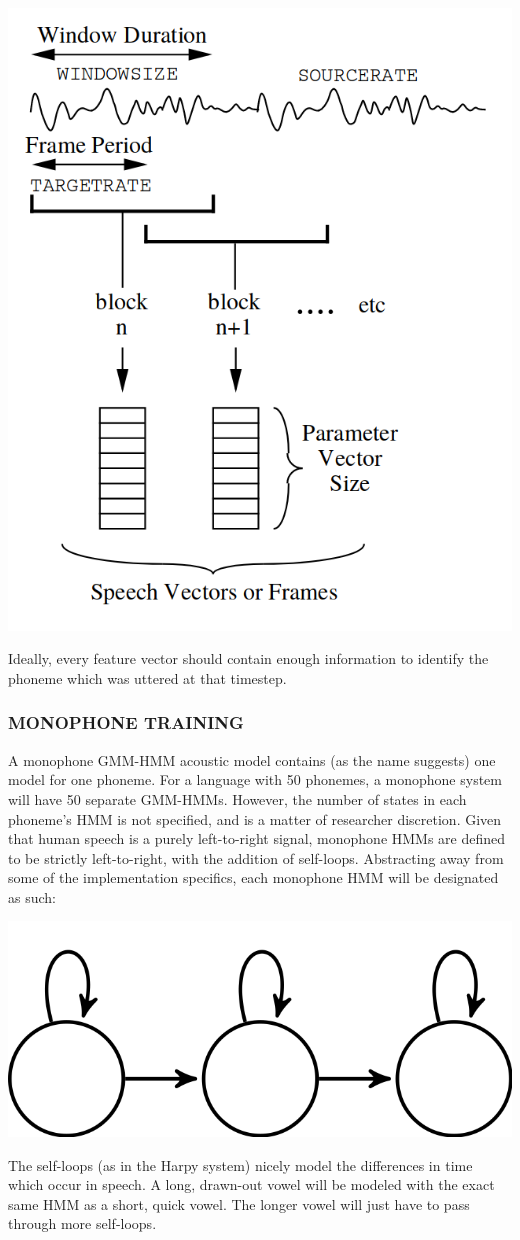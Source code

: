 \documentclass[10pt,a4paper]{article}
\begin{document}
  
\begin{center}
\includegraphics[width=.45\textwidth,keepaspectratio]{figs/htk-feats.png}
\end{center}

Ideally, every feature vector should contain enough information to identify the phoneme which was uttered at that timestep.


\subsubsection*{MONOPHONE TRAINING}

  A monophone GMM-HMM acoustic model contains (as the name suggests) one model for one phoneme. For a language with 50 phonemes, a monophone system will have 50 separate GMM-HMMs. However, the number of states in each phoneme's HMM is not specified, and is a matter of researcher discretion. Given that human speech is a purely left-to-right signal, monophone HMMs are defined to be strictly left-to-right, with the addition of self-loops. Abstracting away from some of the implementation specifics, each monophone HMM will be designated as such:

\begin{center}
\includegraphics[width=.3\textwidth,keepaspectratio]{figs/3-state-hmm.png}
\end{center}

The self-loops (as in the Harpy system) nicely model the differences in time which occur in speech. A long, drawn-out vowel will be modeled with the exact same HMM as a short, quick vowel. The longer vowel will just have to pass through more self-loops.
\end{document}
